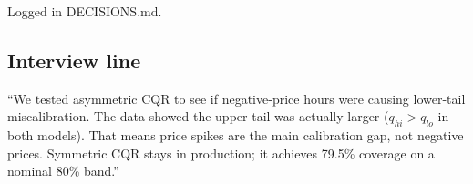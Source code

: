 Logged in DECISIONS.md.

\subsection{Interview line}

``We tested asymmetric CQR to see if negative-price hours were causing
lower-tail miscalibration. The data showed the upper tail was actually
larger ($q_{hi} > q_{lo}$ in both models). That means price spikes are
the main calibration gap, not negative prices. Symmetric CQR stays
in production; it achieves 79.5\% coverage on a nominal 80\% band.''
